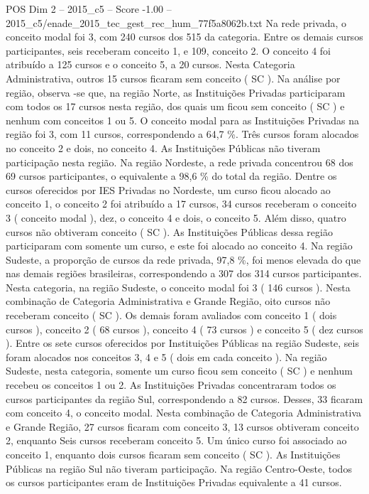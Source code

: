 \begin{textsample}{POS Dim 2 – 2015\_c5 – Score -1.00 – 2015\_c5/enade\_2015\_tec\_gest\_rec\_hum\_77f5a8062b.txt}
Na rede privada, o conceito modal foi 3, com 240 cursos dos 515 da categoria.
Entre os demais cursos participantes, seis receberam conceito 1, e 109, conceito 2.
O conceito 4 foi atribuído a 125 cursos e o conceito 5, a 20 cursos.
Nesta Categoria Administrativa, outros 15 cursos ficaram sem conceito ( SC ).
Na análise por região, observa -se que, na região Norte, as Instituições Privadas participaram com todos os 17 cursos nesta região, dos quais um ficou sem conceito ( SC ) e nenhum com conceitos 1 ou 5.
O conceito modal para as Instituições Privadas na região foi 3, com 11 cursos, correspondendo a 64,7 \%.
Três cursos foram alocados no conceito 2 e dois, no conceito 4.
As Instituições Públicas não tiveram participação nesta região.
Na região Nordeste, a rede privada concentrou 68 dos 69 cursos participantes, o equivalente a 98,6 \% do total da região.
Dentre os cursos oferecidos por IES Privadas no Nordeste, um curso ficou alocado ao conceito 1, o conceito 2 foi atribuído a 17 cursos, 34 cursos receberam o conceito 3 ( conceito modal ), dez, o conceito 4 e dois, o conceito 5.
Além disso, quatro cursos não obtiveram conceito ( SC ).
As Instituições Públicas dessa região participaram com somente um curso, e este foi alocado ao conceito 4.
Na região Sudeste, a proporção de cursos da rede privada, 97,8 \%, foi menos elevada do que nas demais regiões brasileiras, correspondendo a 307 dos 314 cursos participantes.
Nesta categoria, na região Sudeste, o conceito modal foi 3 ( 146 cursos ).
Nesta combinação de Categoria Administrativa e Grande Região, oito cursos não receberam conceito ( SC ).
Os demais foram avaliados com conceito 1 ( dois cursos ), conceito 2 ( 68 cursos ), conceito 4 ( 73 cursos ) e conceito 5 ( dez cursos ).
Entre os sete cursos oferecidos por Instituições Públicas na região Sudeste, seis foram alocados nos conceitos 3, 4 e 5 ( dois em cada conceito ).
Na região Sudeste, nesta categoria, somente um curso ficou sem conceito ( SC ) e nenhum recebeu os conceitos 1 ou 2.
As Instituições Privadas concentraram todos os cursos participantes da região Sul, correspondendo a 82 cursos.
Desses, 33 ficaram com conceito 4, o conceito modal.
Nesta combinação de Categoria Administrativa e Grande Região, 27 cursos ficaram com conceito 3, 13 cursos obtiveram conceito 2, enquanto Seis cursos receberam conceito 5.
Um único curso foi associado ao conceito 1, enquanto dois cursos ficaram sem conceito ( SC ).
As Instituições Públicas na região Sul não tiveram participação.
Na região Centro-Oeste, todos os cursos participantes eram de Instituições Privadas equivalente a 41 cursos.

\end{textsample}
